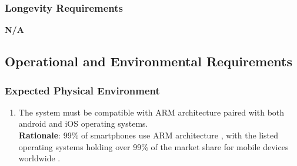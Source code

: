 \subsubsection{Longevity Requirements}
\label{ssub:longevity_requirements}
\textbf{N/A}


\subsection{Operational and Environmental Requirements}
\label{sub:operational_and_environmental_requirements}

\subsubsection{Expected Physical Environment}
\label{ssub:expected_physical_environment}
\begin{enumerate}[{OE-EPE}1. ]
	\item The system must be compatible with ARM architecture paired with both android and iOS operating systems.
	\\ \textbf{Rationale}: 99\% of smartphones use ARM architecture \cite{5}, with the listed operating systems holding over 99\% of the market share for mobile devices worldwide \cite{6}.
\end{enumerate}

